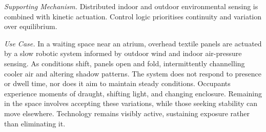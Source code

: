 \emph{Supporting Mechanism.} Distributed indoor and outdoor environmental sensing is combined with kinetic actuation. Control logic prioritises continuity and variation over equilibrium.

\emph{Use Case.} In a waiting space near an atrium, overhead textile panels are actuated by a slow robotic system informed by outdoor wind and indoor air-pressure sensing. As conditions shift, panels open and fold, intermittently channelling cooler air and altering shadow patterns. The system does not respond to presence or dwell time, nor does it aim to maintain steady conditions. Occupants experience moments of draught, shifting light, and changing enclosure. Remaining in the space involves accepting these variations, while those seeking stability can move elsewhere. Technology remains visibly active, sustaining exposure rather than eliminating it.


